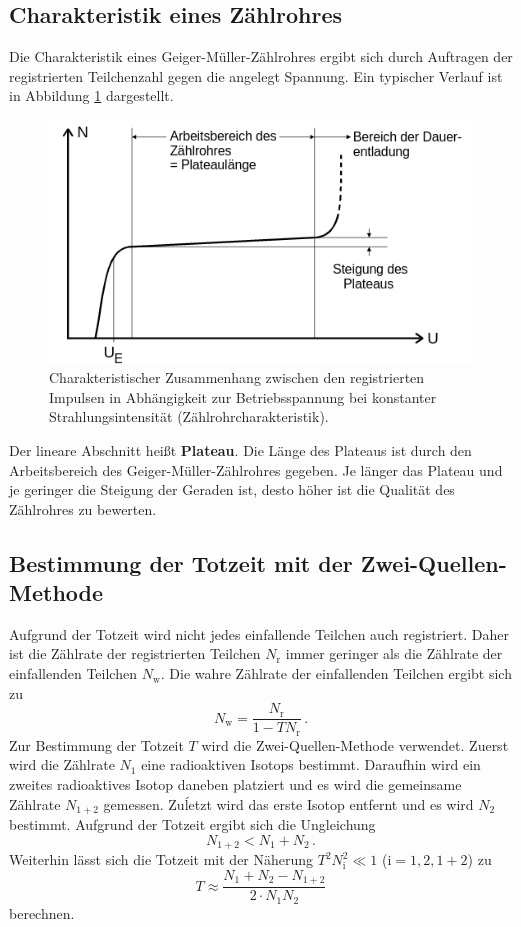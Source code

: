 \subsection{Charakteristik eines Zählrohres}
Die Charakteristik eines Geiger-Müller-Zählrohres ergibt sich durch Auftragen der
registrierten Teilchenzahl gegen die angelegt Spannung. Ein typischer Verlauf ist in Abbildung
\ref{fig:characteristic} dargestellt.
\begin{figure}
  \centering
  \includegraphics[width=\textwidth]{Bilder/graph_zaehlrohrcharakteristik.png}
  \caption{Charakteristischer Zusammenhang zwischen den registrierten Impulsen in Abhängigkeit zur Betriebsspannung bei konstanter Strahlungsintensität (Zählrohrcharakteristik). \cite{Anleitung}}
  \label{fig:characteristic}
\end{figure}
Der lineare Abschnitt heißt \textbf{Plateau}.
Die Länge des Plateaus ist durch den Arbeitsbereich des Geiger-Müller-Zählrohres gegeben.
Je länger das Plateau und je geringer die Steigung der Geraden ist, desto höher ist die
Qualität des Zählrohres zu bewerten.
\subsection{Bestimmung der Totzeit mit der Zwei-Quellen-Methode}
Aufgrund der Totzeit wird nicht jedes einfallende Teilchen auch registriert. Daher ist die
Zählrate der registrierten Teilchen $N_{\mathrm{r}}$ immer geringer als die Zählrate der
einfallenden
Teilchen $N_{\mathrm{w}}$. Die wahre Zählrate der einfallenden Teilchen ergibt sich zu
\begin{equation}
	N_{\mathrm{w}} = \frac{N_{\mathrm{r}}}{1-TN_{\mathrm{r}}} \, \mathrm{.}
\end{equation}
Zur Bestimmung der Totzeit $T$ wird die Zwei-Quellen-Methode verwendet.
Zuerst wird die Zählrate $N_1$ eine radioaktiven Isotops bestimmt.
Daraufhin wird ein zweites radioaktives Isotop daneben platziert und es wird die gemeinsame
Zählrate $N_{1+2}$ gemessen. Zuĺetzt wird das erste Isotop entfernt und es wird $N_2$ bestimmt.
Aufgrund der Totzeit ergibt sich die Ungleichung
\begin{equation*}
	N_{1+2} < N_1 + N_2 \, \mathrm{.}
\end{equation*}
Weiterhin lässt sich die Totzeit mit der Näherung $T^2 N_{\mathrm{i}}^2 \ll 1$ ($\mathrm{i} =
1, 2 , 1+2$) zu
\begin{equation}
	\label{eqn:totzeit}
	T \approx \frac{N_1+N_2-N_{1+2}}{2\cdot N_1N_2}
\end{equation}
berechnen.
